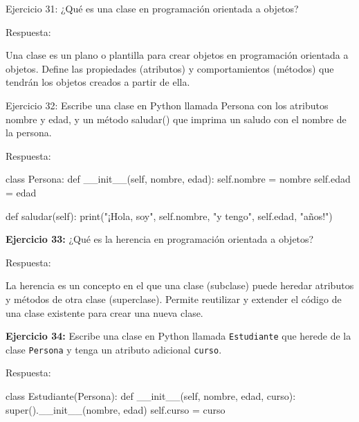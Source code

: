 \documentclass[
  a4paper,
  onepage,
  openany]{scrreprt}
\newenvironment{Shaded}{\begin{snugshade}}{\end{snugshade}}
\newcommand{\BuiltInTok}[1]{\textcolor[rgb]{0.00,0.23,0.31}{#1}}
\newcommand{\FunctionTok}[1]{\textcolor[rgb]{0.28,0.35,0.67}{#1}}
\newcommand{\KeywordTok}[1]{\textcolor[rgb]{0.00,0.23,0.31}{#1}}
\newcommand{\NormalTok}[1]{\textcolor[rgb]{0.00,0.23,0.31}{#1}}
\newcommand{\OperatorTok}[1]{\textcolor[rgb]{0.37,0.37,0.37}{#1}}
\newcommand{\StringTok}[1]{\textcolor[rgb]{0.13,0.47,0.30}{#1}}
\newcommand{\VariableTok}[1]{\textcolor[rgb]{0.07,0.07,0.07}{#1}}
\begin{document}
Ejercicio 31: ¿Qué es una clase en programación orientada a objetos?

Respuesta:

Una clase es un plano o plantilla para crear objetos en programación
orientada a objetos. Define las propiedades (atributos) y
comportamientos (métodos) que tendrán los objetos creados a partir de
ella.

Ejercicio 32: Escribe una clase en Python llamada Persona con los
atributos nombre y edad, y un método saludar() que imprima un saludo con
el nombre de la persona.

Respuesta:

\begin{Shaded}
\begin{Highlighting}[]
\KeywordTok{class}\NormalTok{ Persona:}
    \KeywordTok{def} \FunctionTok{\_\_init\_\_}\NormalTok{(}\VariableTok{self}\NormalTok{, nombre, edad):}
        \VariableTok{self}\NormalTok{.nombre }\OperatorTok{=}\NormalTok{ nombre}
        \VariableTok{self}\NormalTok{.edad }\OperatorTok{=}\NormalTok{ edad}
\end{Highlighting}
\end{Shaded}

\begin{Shaded}
\begin{Highlighting}[]
\KeywordTok{def}\NormalTok{ saludar(}\VariableTok{self}\NormalTok{):}
    \BuiltInTok{print}\NormalTok{(}\StringTok{"¡Hola, soy"}\NormalTok{, }\VariableTok{self}\NormalTok{.nombre, }\StringTok{"y tengo"}\NormalTok{, }\VariableTok{self}\NormalTok{.edad, }\StringTok{"años!"}\NormalTok{)}
\end{Highlighting}
\end{Shaded}

\textbf{Ejercicio 33:} ¿Qué es la herencia en programación orientada a
objetos?

Respuesta:

La herencia es un concepto en el que una clase (subclase) puede heredar
atributos y métodos de otra clase (superclase). Permite reutilizar y
extender el código de una clase existente para crear una nueva clase.

\textbf{Ejercicio 34:} Escribe una clase en Python llamada
\texttt{Estudiante} que herede de la clase \texttt{Persona} y tenga un
atributo adicional \texttt{curso}.

Respuesta:

\begin{Shaded}
\begin{Highlighting}[]
\KeywordTok{class}\NormalTok{ Estudiante(Persona):}
    \KeywordTok{def} \FunctionTok{\_\_init\_\_}\NormalTok{(}\VariableTok{self}\NormalTok{, nombre, edad, curso):}
        \BuiltInTok{super}\NormalTok{().}\FunctionTok{\_\_init\_\_}\NormalTok{(nombre, edad)}
        \VariableTok{self}\NormalTok{.curso }\OperatorTok{=}\NormalTok{ curso}
\end{Highlighting}
\end{Shaded}
\end{document}
